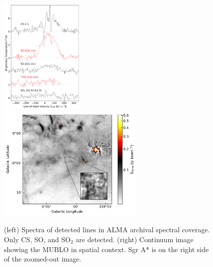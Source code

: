 \documentclass[12pt,a4paper]{article}  %
\begin{document}
\begin{figure}[htp!]
    \centering
    \includegraphics[width=0.36\textwidth]{figures/CSandSO_Overlays.pdf}
    \includegraphics[width=0.63\textwidth]{figures/MUSTANG3mmContext.pdf}
    \caption{(left) Spectra of detected lines in ALMA archival spectral coverage.
    Only CS, SO, and SO$_2$ are detected. (right) Continuum image showing the MUBLO in spatial context. Sgr A* is on the right side of the zoomed-out image.
    }
    \label{fig:coarse_spectra}
\end{figure}
\end{document}

